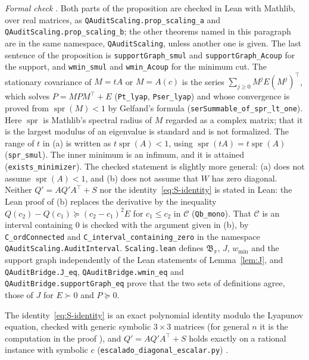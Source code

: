 {\sloppy \emph{Formal check} \stM. Both parts of the proposition are checked in Lean with Mathlib, over real matrices, as \texttt{QAuditScaling.prop\_scaling\_a} and \texttt{QAuditScaling.prop\_scaling\_b}; the other theorems named in this paragraph are in the same namespace, \texttt{QAuditScaling}, unless another one is given. The last sentence of the proposition is \texttt{supportGraph\_smul} and \texttt{supportGraph\_Acoup} for the support, and \texttt{wmin\_smul} and \texttt{wmin\_Acoup} for the minimum cut. The stationary covariance of $M=tA$ or $M=A(c)$ is the series $\sum_{j\ge0}M^jE(M^j)^\top$, which solves $P=MPM^\top+E$ (\texttt{Pt\_lyap}, \texttt{Pser\_lyap}) and whose convergence is proved from $\operatorname{spr}(M)<1$ by Gelfand's formula (\texttt{serSummable\_of\_spr\_lt\_one}). Here $\operatorname{spr}$ is Mathlib's spectral radius of $M$ regarded as a complex matrix; that it is the largest modulus of an eigenvalue is standard and is not formalized. The range of $t$ in (a) is written as $t\operatorname{spr}(A)<1$, using $\operatorname{spr}(tA)=t\operatorname{spr}(A)$ (\texttt{spr\_smul}). The inner minimum is an infimum, and it is attained (\texttt{exists\_minimizer}). The checked statement is slightly more general: (a) does not assume $\operatorname{spr}(A)<1$, and (b) does not assume that $W$ has zero diagonal. Neither $Q'=AQ'A^\top+S$ nor the identity~\eqref{eq:S-identity} is stated in Lean: the Lean proof of (b) replaces the derivative by the inequality $Q(c_2)-Q(c_1)\succeq(c_2-c_1)^2E$ for $c_1\le c_2$ in $\mathcal C$ (\texttt{Qb\_mono}). That $\mathcal C$ is an interval containing $0$ is checked with the argument given in (b), by \texttt{C\_ordConnected} and \texttt{C\_interval\_containing\_zero} in the namespace \texttt{QAuditScaling.AuditInterval}. \texttt{Scaling.lean} defines $\mathfrak B_\pi$, $J$, $w_{\min}$ and the support graph independently of the Lean statements of Lemma~\ref{lem:J}, and \texttt{QAuditBridge.J\_eq}, \texttt{QAuditBridge.wmin\_eq} and \texttt{QAuditBridge.supportGraph\_eq} prove that the two sets of definitions agree, those of $J$ for $E\succ0$ and $P\succeq0$.\par}

The identity~\eqref{eq:S-identity} is an exact polynomial identity modulo the Lyapunov equation, checked with generic symbolic $3\times3$ matrices (for general $n$ it is the computation in the proof \stA), and $Q'=AQ'A^\top+S$ holds exactly on a rational instance with symbolic $c$ (\texttt{escalado\_diagonal\_escalar.py}) \stS.

